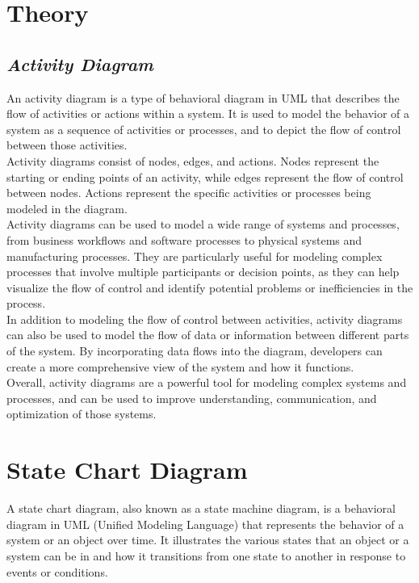 \documentclass{article}
\begin{document}
\section{\textbf{Theory}}
\subsection{\textit{Activity Diagram}}
An activity diagram is a type of behavioral diagram in UML that describes the flow of activities or actions within a system. It is used to model the behavior of a system as a sequence of activities or processes, and to depict the flow of control between those activities.\\

Activity diagrams consist of nodes, edges, and actions. Nodes represent the starting or ending points of an activity, while edges represent the flow of control between nodes. Actions represent the specific activities or processes being modeled in the diagram.\\

Activity diagrams can be used to model a wide range of systems and processes, from business workflows and software processes to physical systems and manufacturing processes. They are particularly useful for modeling complex processes that involve multiple participants or decision points, as they can help visualize the flow of control and identify potential problems or inefficiencies in the process.\\

In addition to modeling the flow of control between activities, activity diagrams can also be used to model the flow of data or information between different parts of the system. By incorporating data flows into the diagram, developers can create a more comprehensive view of the system and how it functions.\\

Overall, activity diagrams are a powerful tool for modeling complex systems and processes, and can be used to improve understanding, communication, and optimization of those systems.
\section{\textbf{State Chart Diagram}}
A state chart diagram, also known as a state machine diagram, is a behavioral diagram in UML (Unified Modeling Language) that represents the behavior of a system or an object over time. It illustrates the various states that an object or a system can be in and how it transitions from one state to another in response to events or conditions.
\end{document}
